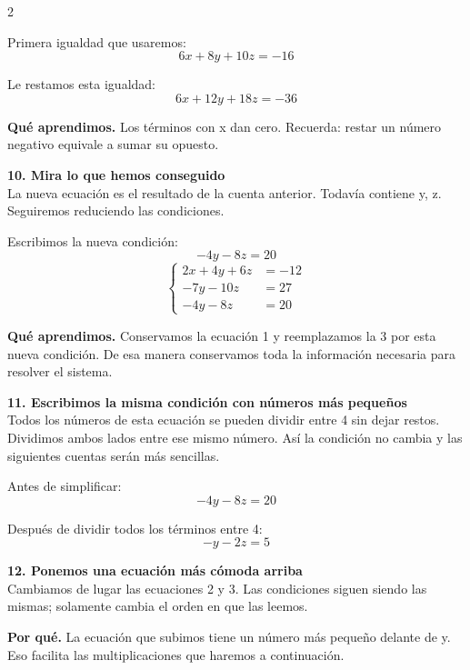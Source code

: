 \documentclass[11pt,a4paper,landscape]{article}
\begin{document}
\begin{multicols*}{2}
\begin{minipage}{\linewidth}
\par\smallskip Primera igualdad que usaremos:
\[6x + 8y + 10z = -16\]
\par\smallskip Le restamos esta igualdad:
\[6x + 12y + 18z = -36\]
\par\smallskip\textbf{Qué aprendimos.} Los términos con x dan cero. Recuerda: restar un número negativo equivale a sumar su opuesto.
\end{minipage}\par\medskip
\noindent\begin{minipage}{\linewidth}\textbf{10. Mira lo que hemos conseguido}\\[2pt]La nueva ecuación es el resultado de la cuenta anterior. Todavía contiene y, z. Seguiremos reduciendo las condiciones.
\par\smallskip Escribimos la nueva condición:
\[-4y - 8z = 20\]
\[\left\{\begin{aligned}2x + 4y + 6z &= -12\\-7y - 10z &= 27\\-4y - 8z &= 20\end{aligned}\right.\]
\par\smallskip\textbf{Qué aprendimos.} Conservamos la ecuación 1 y reemplazamos la 3 por esta nueva condición. De esa manera conservamos toda la información necesaria para resolver el sistema.
\end{minipage}\par\medskip
\noindent\begin{minipage}{\linewidth}\textbf{11. Escribimos la misma condición con números más pequeños}\\[2pt]Todos los números de esta ecuación se pueden dividir entre 4 sin dejar restos. Dividimos ambos lados entre ese mismo número. Así la condición no cambia y las siguientes cuentas serán más sencillas.
\par\smallskip Antes de simplificar:
\[-4y - 8z = 20\]
\par\smallskip Después de dividir todos los términos entre 4:
\[-y - 2z = 5\]
\end{minipage}\par\medskip
\noindent\begin{minipage}{\linewidth}\textbf{12. Ponemos una ecuación más cómoda arriba}\\[2pt]Cambiamos de lugar las ecuaciones 2 y 3. Las condiciones siguen siendo las mismas; solamente cambia el orden en que las leemos.
\par\smallskip\textbf{Por qué.} La ecuación que subimos tiene un número más pequeño delante de y. Eso facilita las multiplicaciones que haremos a continuación.

\end{minipage}
\end{multicols*}
\end{document}
